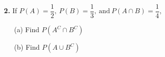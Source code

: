 \documentclass[12pt]{report}
\begin{document}
\pagebreak






\noindent {} $~$\textbf{2.} If $P(A)=\dfrac{1}{2},~P(B)=\dfrac{1}{3},~\text{and}~P(A\cap B)=\dfrac{1}{4}$,
\begin{itemize}
\item [(a)] Find $P(A^C\cap B^C)$		%
\item [(b)] Find $P(A \cup B^C)$
\end{itemize}

%
%
\pagebreak
\end{document}
